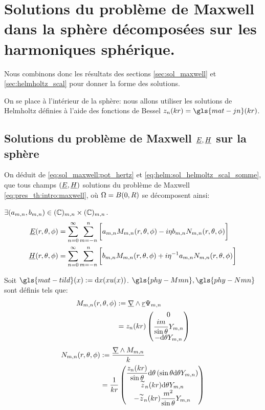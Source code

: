 \section{Solutions du problème de Maxwell dans la sphère décomposées sur les harmoniques sphérique.}\label{sec:maxwell_harmonique}

Nous combinons donc les résultats des sections \ref{sec:sol_maxwell} et \ref{sec:helmholtz_scal} pour donner la forme des solutions.

On se place à l'intérieur de la sphère: nous allons utiliser les solutions de Helmholtz définies à l'aide des fonctions de Bessel $z_n(kr) = \gls{mat-jn}(kr)$.



\subsection{Solutions du problème de Maxwell $\underline{E},\underline{H}$ sur la sphère}
On déduit de  \eqref{eq:sol_maxwell:pot_hertz} et \eqref{eq:helm:sol_helmoltz_scal_somme}, que tous champs $(\underline{E},\underline{H})$ solutions du problème de Maxwell \eqref{eq:pres_th:intro:maxwell}, où $\Omega = B(0,R)$ se décomposent ainsi:

$\exists (a_{m,n},b_{m,n}) \in (\mathbb C)_{m,n}\times (\mathbb C)_{m,n}$.
\begin{align*}
  \underline{E}(r,\theta,\phi) &= \sum\limits_{n=0}^\infty\sum\limits_{m=-n}^n\bigg[ a_{m,n}   M_{m,n}(r,\theta,\phi) - i \eta b_{m,n} N_{m,n}(r,\theta,\phi)\bigg]\\
  \underline{H}(r,\theta,\phi) &= \sum\limits_{n=0}^\infty\sum\limits_{m=-n}^n\bigg[ b_{m,n}   M_{m,n}(r,\theta,\phi) + i {\eta}^{-1} a_{m,n} N_{m,n}(r,\theta,\phi)\bigg]
\end{align*}

Soit $\gls{mat-tild}(x) := \dd{x}{\left(xu(x)\right)}$. $\gls{phy-Mmn} ,\gls{phy-Nmn}$ sont définis tels que:
\begin{align}
 \label{eq:defMmn}
  M_{m,n}(r,\theta,\phi) &:= \underline{\nabla} \wedge \underline{r} \Psi_{m,n} \\
  &= z_n(kr)
  \begin{pmatrix}
    0 \\ \dfrac{im}{\sin\theta}Y_{m,n}\\ 
    - \mathrm{d}{\theta}{Y_{m,n}}
  \end{pmatrix}
\end{align}
\begin{align}
\label{eq:defNmn}
  N_{m,n}(r,\theta,\phi) &:= \dfrac{\underline{\nabla} \wedge M_{m,n}}{k} \\
  &= \dfrac{1}{kr}\begin{pmatrix}
    \dfrac{z_n(kr)}{\sin\theta}\mathrm{d}{\theta}\left(\sin\theta\mathrm{d}{\theta}{Y_{m,n}}\right)\\ 
    \overset{\thicksim}{z}_n(kr)\mathrm{d}{\theta}{Y_{m,n}}\\ 
    -\overset{\thicksim}{z}_n(kr)\dfrac{m^2}{\sin\theta}Y_{m,n}\\
  \end{pmatrix} 
\end{align}



